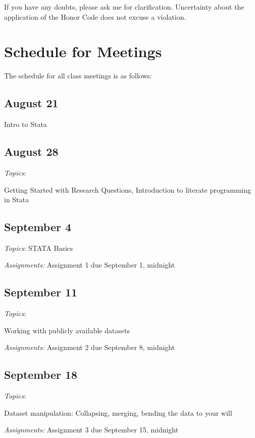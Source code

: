 \documentclass[12pt]{article}
\begin{document}
If you have any doubts, please ask me for clarification. Uncertainty
about the application of the Honor Code does not excuse a violation.

\section{Schedule for Meetings}

The schedule for all class meetings is as follows:

\begin{flushleft}


\subsection{August 21}

Intro to Stata

\subsection{August 28}

\textit{Topics}:

Getting Started with Research Questions, Introduction to literate
programming in Stata

\subsection{September 4}

\textit{Topics}:
STATA Basics

\textit {Assignments:}
Assignment 1 due September 1, midnight

\subsection{September 11}

\textit{Topics}:

Working with publicly available datasets

\textit {Assignments:}
Assignment 2 due September 8, midnight

\subsection{September 18}

\textit{Topics}:

Dataset manipulation: Collapsing, merging, bending the data to your will

\textit {Assignments:}
Assignment 3 due September 15, midnight


\end{flushleft}
\end{document}
